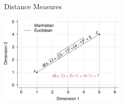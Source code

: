 \documentclass[11pt,compress,t,notes=noshow, xcolor=table]{beamer}
\newenvironment{knitrout}{}{} %
\begin{document}
\begin{vbframe}{Distance Measures}
% 
\vspace{-0.1cm}
\begin{knitrout}\scriptsize
{}\color{fgcolor}

{\centering \includegraphics[width=0.45\textwidth,keepaspectratio]{figure/reg_knn_2} 

}
\end{knitrout}
\end{vbframe}
\end{document}
